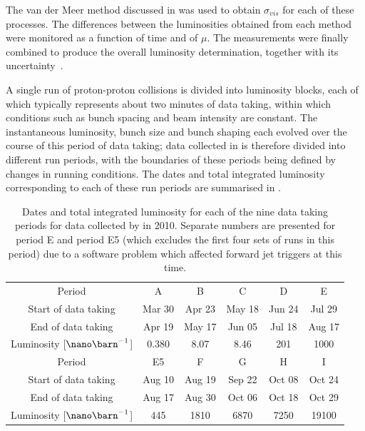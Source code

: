 The van der Meer method discussed in  was used
to obtain $\sigma_{vis}$ for each of these processes. The differences between the
luminosities obtained from each method were monitored as a function of time
and of $\mu$. The measurements were finally combined to produce the overall \ATLAS
luminosity determination, together with its uncertainty~\cite{CERN-PH-EP-2010-069}.

A single run of proton-proton collisions is divided into luminosity blocks, each of
which typically represents about two minutes of data taking, within which
conditions such as bunch spacing and beam intensity are constant. The
instantaneous luminosity, bunch size and bunch shaping each evolved over the
course of this period of data taking; data collected in \ATLAS is therefore divided
into different run periods, with the boundaries of these periods being defined by
changes in running conditions. The dates and total integrated luminosity corresponding
to each of these run periods are summarised in .

\begin{table}
\begin{center}
  \begin{tabular}{ c@{\hskip 1cm} c c c c c }
    Period                         &   A    &   B    &   C    &   D    &   E    \\
    Start of data taking           & Mar 30 & Apr 23 & May 18 & Jun 24 & Jul 29 \\
    End of data taking             & Apr 19 & May 17 & Jun 05 & Jul 18 & Aug 17 \\
    Luminosity [$\nano\barn^{-1}$] & 0.380  & 8.07   & 8.46   & 201    & 1000   \\
    \cmidrule{2-6}
    Period                         &   E5   &   F    &   G    &   H    &  I     \\
    Start of data taking           & Aug 10 & Aug 19 & Sep 22 & Oct 08 & Oct 24 \\
    End of data taking             & Aug 17 & Aug 30 & Oct 06 & Oct 18 & Oct 29 \\
    Luminosity [$\nano\barn^{-1}$] & 445    & 1810   & 6870   & 7250   & 19100  \\
  \end{tabular}
  \caption{Dates and total integrated luminosity for each of the nine data taking periods for data collected by \ATLAS in 2010. Separate numbers are presented for period E and period E5 (which excludes the first four sets of runs in this period) due to a software problem which affected forward jet triggers at this time.}
  \label{tab:analysis-tools:luminosity-periods}
\end{center}
\end{table}

